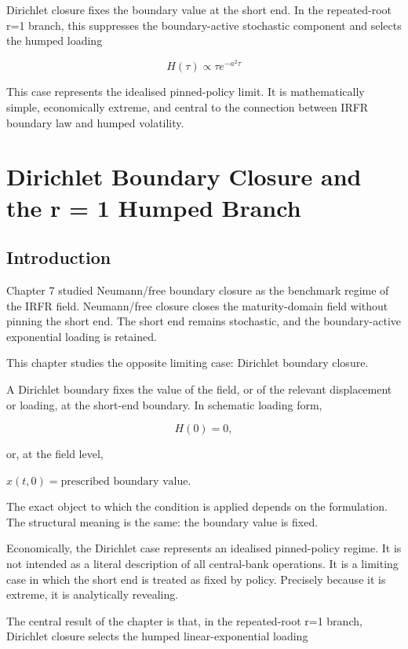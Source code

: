 \documentclass[11pt,oneside]{book}
\begin{document}
Dirichlet closure fixes the boundary value at the short end. In the
repeated-root r=1 branch, this suppresses the boundary-active stochastic
component and selects the humped loading

\[
H(\tau) \propto \tau e^{-a^2\tau}
\]

This case represents the idealised pinned-policy limit. It is
mathematically simple, economically extreme, and central to the
connection between IRFR boundary law and humped volatility.

\chapter{Dirichlet Boundary Closure and the r = 1 Humped Branch}\label{chapter-8}

\section{Introduction}\label{introduction-5}

Chapter 7 studied Neumann/free boundary closure as the benchmark regime
of the IRFR field. Neumann/free closure closes the maturity-domain field
without pinning the short end. The short end remains stochastic, and the
boundary-active exponential loading is retained.

This chapter studies the opposite limiting case: Dirichlet boundary
closure.

A Dirichlet boundary fixes the value of the field, or of the relevant
displacement or loading, at the short-end boundary. In schematic loading
form,

\[
H(0)=0,
\]

or, at the field level,

\begin{center}\(x(t,0)=\text{prescribed boundary value}\).\end{center}

The exact object to which the condition is applied depends on the
formulation. The structural meaning is the same: the boundary value is
fixed.

Economically, the Dirichlet case represents an idealised pinned-policy
regime. It is not intended as a literal description of all central-bank
operations. It is a limiting case in which the short end is treated as
fixed by policy. Precisely because it is extreme, it is analytically
revealing.

The central result of the chapter is that, in the repeated-root r=1
branch, Dirichlet closure selects the humped linear-exponential loading
\end{document}
